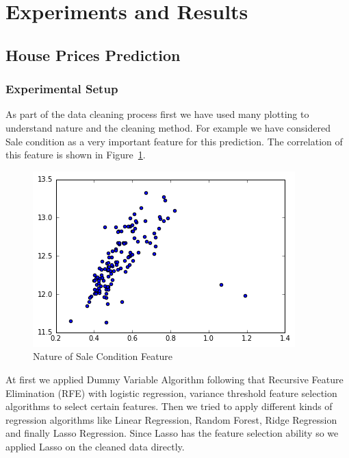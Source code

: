 \documentclass[fleqn,10pt]{SelfArx} %
\begin{document}
\section{Experiments and Results}\label{experiments}
\subsection{House Prices Prediction}

\subsubsection{Experimental Setup}


As part of the data cleaning process first we have used many plotting to understand nature and the cleaning method. 
For example we have considered Sale condition as a very important feature for this prediction. The correlation of this feature is shown in Figure~\ref{fig:Figure3}.

\begin{figure}[ht]\centering %
\includegraphics[width=\linewidth]{Figure3}
\caption{Nature of Sale Condition Feature}
\label{fig:Figure3}
\end{figure}

At first we applied Dummy Variable Algorithm following that Recursive Feature Elimination (RFE) with logistic regression, variance threshold feature selection algorithms to select certain features.  Then we tried to apply different kinds of regression algorithms like Linear Regression, Random Forest, Ridge Regression and finally Lasso Regression. Since Lasso has the feature selection ability so we applied Lasso on the cleaned data directly.
\end{document}
